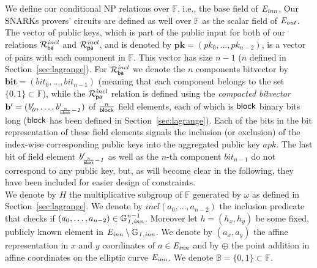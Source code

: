 \noindent We define our conditional NP relations over $\mathbb{F}$, i.e., the base field of $\mathit{E}_{\mathit{inn}}$. 
Our SNARKs provers' circuits are defined as well over $\mathbb{F}$ as the scalar field of $\mathit{E}_{\mathit{out}}$. The vector of public keys, which is part of the public input for both of our 
relations $\mathcal{R}^{\mathit{incl}}_{\mathsf{ba}}$ and $\mathcal{R}^{\mathit{incl}}_{\mathsf{pa}}$, and is denoted by $\mathbf{pk} = (\mathit{pk_0}, \ldots, \mathit{pk_{n-2}})$, is a vector of pairs with each component 
in $\mathbb{F}$. This vector has size $n-1$ ($n$ defined in 
Section~\ref{sec:lagrange}). For $\mathcal{R}^{\mathit{incl}}_{\mathsf{ba}}$ we denote 
the $n$ components bitvector by $\mathbf{bit} = (\mathit{bit_0}, \ldots, \mathit{bit_{n-1}})$ 
(meaning that each component belongs to the set $\{0,1\} \subset \mathbb{F}$), 
while the $\mathcal{R}^{\mathit{incl}}_{\mathsf{pa}}$ relation is defined using the \emph{compacted bitvector} 
$\mathbf{b'} = (\mathit{b'_{0}}, \ldots, \mathit{b'_{\frac{n}{\mathsf{block}}-1}})$ of $\frac{n}{\mathsf{block}}$ field elements, 
each of which is $\mathsf{block}$ binary bits long ($\mathsf{block}$ has been defined in Section~\ref{sec:lagrange}). 
Each of the bits in the bit representation of these field elements signals the 
inclusion (or exclusion) of the index-wise corresponding public keys into the aggregated public key $\mathit{apk}$. The last bit of field element $\mathit{b'_{\frac{n}{\mathsf{block}}-1}}$ as well as the $n$-th component $\mathit{bit_{n-1}}$ do not correspond to any public key, 
but, as will become clear in the following, they have been included for easier design of constraints. \\ 
\vspace{-0.009in}
\noindent We denote by $H$ the multiplicative subgroup of $\mathbb{F}$ generated 
by $\omega$ as defined in Section~\ref{sec:lagrange}. We denote by $\mathit{incl}(a_0, \ldots, a_{n-2})$ the inclusion 
predicate that checks if  $(a_0, \ldots, a_{n-2}) \in \mathbb{G}_{\mathit{1,inn}}^{n-1}$. Moreover let $h = (\mathit{h_x}, \mathit{h_y})$ 
be some fixed, publicly known element in $\mathit{E}_{\mathit{inn}} \setminus \mathbb{G}_{\mathit{1,inn}}$. We denote by $(a_x, a_y)$ the affine representation in 
$x$ and $y$ coordinates of $a \in \mathit{E}_{\mathit{inn}}$ and by $\oplus$ the point addition in affine coordinates on the elliptic curve $\mathit{E}_{\mathit{inn}}$. 
We denote $\mathbb{B} = \{0,1\} \subset \mathbb{F}$. \\
\vspace{-0.15in}

\vspace{-0.1in}
